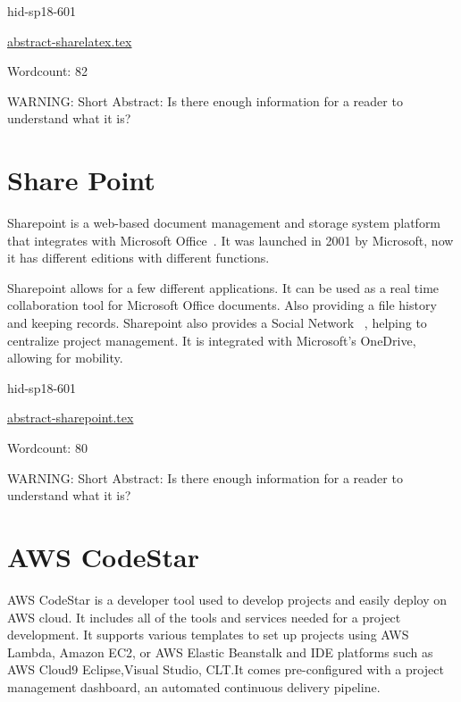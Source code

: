 \begin{IU}

hid-sp18-601

\href{https://github.com/cloudmesh-community/hid-sp18-601/blob/master//technology/abstract-sharelatex.tex}{abstract-sharelatex.tex}

 

Wordcount: 82

WARNING: Short Abstract: Is there enough information for a reader to understand what it is?

\end{IU}

\section{Share Point}

Sharepoint is a web-based document management and storage system platform that 
integrates with Microsoft Office~\cite{hid-sp18-601-www-spoint-website}. It was
 launched in 2001 by Microsoft, now it 
has different editions with different functions.

Sharepoint allows for a few different applications. It can be used as a real 
time collaboration tool for Microsoft Office documents. Also providing a 
file history and keeping records. Sharepoint also provides a Social Network 
~\cite{hid-sp18-601-www-spoint-new-sharepoint}, 
helping to centralize project management. It is integrated with Microsoft's 
OneDrive, allowing for mobility.

\begin{IU}

hid-sp18-601

\href{https://github.com/cloudmesh-community/hid-sp18-601/blob/master//technology/abstract-sharepoint.tex}{abstract-sharepoint.tex}

 

Wordcount: 80

WARNING: Short Abstract: Is there enough information for a reader to understand what it is?

\end{IU}

\section{AWS CodeStar}

AWS CodeStar is a developer tool used to develop projects and easily deploy on 
AWS cloud. It includes all of the tools and services needed for a project development.    
It supports various templates to set up projects using AWS Lambda, Amazon EC2, or AWS Elastic Beanstalk 
and IDE platforms such as AWS Cloud9 Eclipse,Visual Studio, CLT.It comes pre-configured with a 
project management dashboard, an automated continuous delivery pipeline.  

